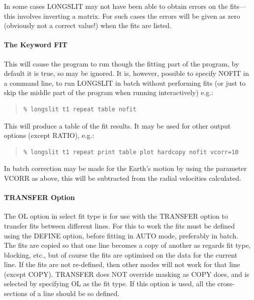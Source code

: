 \documentclass[11pt,twoside]{article}
\begin{document}
In some cases LONGSLIT may not have been able to obtain errors on the
fits---this involves inverting a matrix.
For such cases the errors will be given as zero (obviously not a correct
value!) when the fits are listed.

\paragraph{The Keyword FIT}
\label{long.fit}

This will cause the program to run though the fitting part of the
program, by default it is true, so may be ignored. It is, however,
possible to specify NOFIT in a command line, to run LONGSLIT in batch
without performing fits (or just to skip the middle part of the program
when running interactively) e.g.:

\begin{quote}\begin{verbatim}
% longslit t1 repeat table nofit
\end{verbatim}\end{quote}

This will produce a table of the fit results.
It may be used for other output options (except RATIO), e.g.:

\begin{quote}\begin{verbatim}
% longslit t1 repeat print table plot hardcopy nofit vcorr=10
\end{verbatim}\end{quote}

In batch correction may be made for the Earth's motion by using the
parameter VCORR as above, this will be subtracted from the radial
velocities calculated.

\paragraph{TRANSFER Option}

The OL option in select fit type is for use with the TRANSFER option to
transfer fits between different lines. For this to work the fits must
be defined using the DEFINE option, before fitting in AUTO mode,
preferably in batch. The fits are copied so that one line becomes a
copy of another as regards fit type, blocking, etc., but of course the
fits are optimised on the data for the current line. If the fits are
not re-defined, then other modes will not work for that line (except
COPY). TRANSFER does NOT override masking as COPY does, and is selected
by specifying OL as the fit type.
If this option is used, all the cross-sections of a line should be so
defined.
\end{document}
